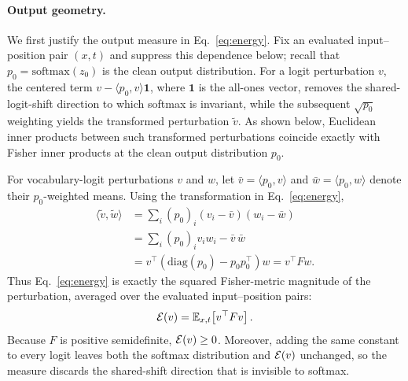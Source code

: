 \paragraph{Output geometry.}
We first justify the output measure in Eq.~\ref{eq:energy}.
Fix an evaluated input--position pair $(x,t)$ and suppress this dependence below;
recall that $p_0=\mathrm{softmax}(z_0)$ is the clean output distribution.
For a logit perturbation $v$, the centered term
$v-\langle p_0,v\rangle\mathbf{1}$, where $\mathbf{1}$ is the all-ones vector,
removes the shared-logit-shift direction to which softmax is invariant, while the
subsequent $\sqrt{p_0}$ weighting yields the transformed perturbation $\widetilde v$.
As shown below, Euclidean inner products between such transformed perturbations
coincide exactly with Fisher inner products at the clean output distribution $p_0$.

For vocabulary-logit perturbations $v$ and $w$, let
$\bar v=\langle p_0,v\rangle$ and $\bar w=\langle p_0,w\rangle$
denote their $p_0$-weighted means.
Using the transformation in Eq.~\ref{eq:energy},
\begin{equation}
\begin{aligned}
\langle\widetilde v,\widetilde w\rangle
&=
\sum_i (p_0)_i(v_i-\bar v)(w_i-\bar w) \\
&=
\sum_i (p_0)_i v_iw_i-\bar v\,\bar w \\
&=
v^\top
\left(\mathrm{diag}(p_0)-p_0p_0^\top\right)w
=
v^\top Fw .
\end{aligned}
\label{eq:app_fisher_identity}
\end{equation}
Thus Eq.~\ref{eq:energy} is exactly the squared Fisher-metric magnitude of the
perturbation, averaged over the evaluated input--position pairs:
\begin{equation}
\mathcal{E}(v)
=
\mathbb{E}_{x,t}\!\left[v^\top Fv\right].
\label{eq:app_energy_fisher}
\end{equation}
Because $F$ is positive semidefinite, $\mathcal{E}(v)\geq 0$.
Moreover, adding the same constant to every logit leaves both the softmax
distribution and $\mathcal{E}(v)$ unchanged, so the measure discards the shared-shift
direction that is invisible to softmax.

